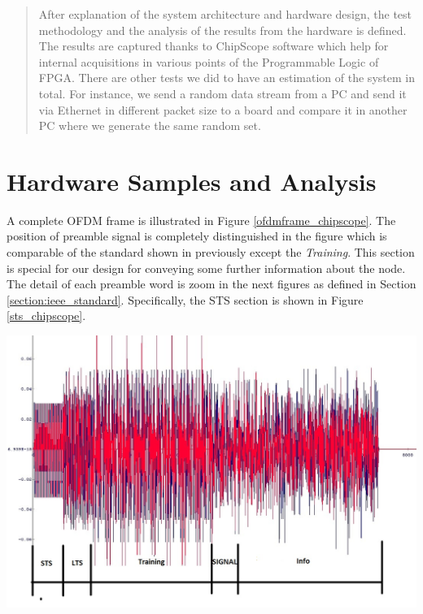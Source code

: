 
\begin{abstract}
After explanation of the system architecture and hardware design, the test methodology and the analysis of the results from the hardware is defined. The results are captured thanks to ChipScope software which help for internal acquisitions in various points of the Programmable Logic of FPGA. There are other tests we did to have an estimation of the system in total. For instance, we send a random data stream from a PC and send it via Ethernet in different packet size to a board and compare it in another PC where we generate the same random set.\\
\end{abstract}

\section{Hardware Samples and Analysis}
\label{hw_samples}

A complete OFDM frame is illustrated in Figure \ref{ofdmframe_chipscope}. The position of preamble signal is completely distinguished in the figure which is comparable of the standard shown in previously except the \textit{Training}. This section is special for our design for conveying some further information about the node. The detail of each preamble word is zoom in the next figures as defined in Section \ref{section:ieee_standard}. Specifically, the STS section is shown in Figure \ref{sts_chipscope}.\\
\begin{center}
\includegraphics[width=\textwidth]{content/fig/ofdmframe_chipscope.JPG}
\label{ofdmframe_chipscope}
\end{center}

